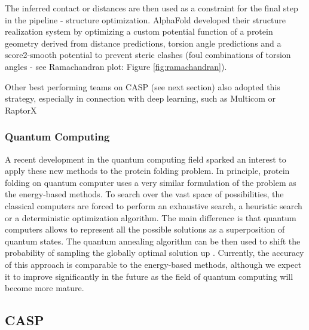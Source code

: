 The inferred contact or distances are then used as a constraint for the final step in the pipeline - structure optimization. 
AlphaFold developed their structure realization system by optimizing a custom potential function of a protein geometry derived from distance predictions, torsion angle predictions and a score2-smooth potential to prevent steric clashes (foul combinations of torsion angles - see Ramachandran plot: Figure \ref{fig:ramachandran}).

Other best performing teams on CASP (see next section) also adopted this strategy, especially in connection with deep learning, such as Multicom \cite{multicom} or RaptorX \cite{raptorx}

\subsubsection{Quantum Computing}
A recent development in the quantum computing field sparked an interest to apply these new methods to the protein folding problem.
In principle, protein folding on quantum computer uses a very similar formulation of the problem as the energy-based methods.
To search over the vast space of possibilities, the classical computers are forced to perform an exhaustive search, a heuristic search or a deterministic optimization algorithm.
The main difference is that quantum computers allows to represent all the possible solutions as a superposition of quantum states. 
The quantum annealing algorithm can be then used to shift the probability of sampling the globally optimal solution up \cite{mulligan2019designing}.
Currently, the accuracy of this approach is comparable to the energy-based methods, although we expect it to improve significantly in the future as the field of quantum computing will become more mature.  

\subsection{CASP}

